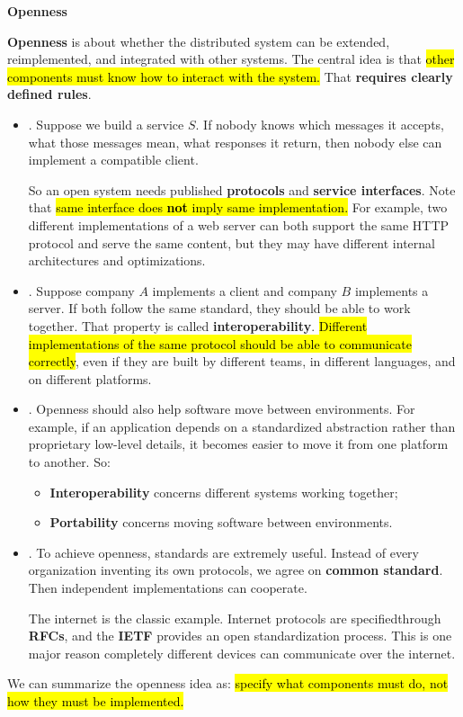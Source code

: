 \newpage

\begin{flushleft}
    \textcolor{Red2}{ \textbf{Openness}}
    \label{item:interoperability}
\end{flushleft}
\textbf{Openness} is about whether the distributed system can be extended, reimplemented, and integrated with other systems. The central idea is that \hl{other components must know how to interact with the system.} That \textbf{requires clearly defined rules}.
\begin{itemize}
    \item {}. Suppose we build a service $S$. If nobody knows which messages it accepts, what those messages mean, what responses it return, then nobody else can implement a compatible client.

        \highspace
        So an open system needs published \textbf{protocols} and \textbf{service interfaces}. Note that \hl{same interface does \textbf{not} imply same implementation.} For example, two different implementations of a web server can both support the same HTTP protocol and serve the same content, but they may have different internal architectures and optimizations.

    \item {}. Suppose company $A$ implements a client and company $B$ implements a server. If both follow the same standard, they should be able to work together. That property is called \textbf{interoperability}. \hl{Different implementations of the same protocol should be able to communicate correctly}, even if they are built by different teams, in different languages, and on different platforms.

    \item {}. Openness should also help software move between environments. For example, if an application depends on a standardized abstraction rather than proprietary low-level details, it becomes easier to move it from one platform to another. So:
        \begin{itemize}
            \item \textbf{Interoperability} concerns different systems working together;
            \item \textbf{Portability} concerns moving software between environments.
        \end{itemize}

    \item {}. To achieve openness, standards are extremely useful. Instead of every organization inventing its own protocols, we agree on \textbf{common standard}. Then independent implementations can cooperate.

        The internet is the classic example. Internet protocols are specified\break through \textbf{RFCs}, and the \textbf{IETF} provides an open standardization process. This is one major reason completely different devices can communicate over the internet.
\end{itemize}
We can summarize the openness idea as: \hl{specify what components must do, not how they must be implemented.}

